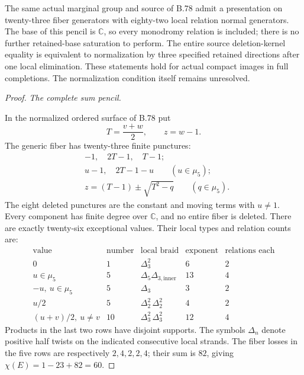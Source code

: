 The same actual marginal group and source of B.78 admit a presentation
on twenty-three fiber generators with eighty-two local relation normal
generators. The base of this pencil is \(\mathbb C\), so every monodromy
relation is included; there is no further retained-base saturation to
perform. The entire source deletion-kernel equality is equivalent to
normalization by three specified retained directions after one local
elimination. These statements hold for actual compact images in full
completions. The normalization condition itself remains unresolved.

\begin{proof}
\emph{The complete sum pencil.}\par
In the normalized ordered surface of B.78 put
\[
              T=\frac{v+w}{2},\qquad z=w-1.
 \tag{B.79.1}
\]
The generic fiber has twenty-three finite punctures:
\[
\begin{split}
 &-1,\quad 2T-1,\quad T-1;\\
 &u-1,\quad 2T-1-u\qquad(u\in\mu _5);\\
 &z=(T-1)\pm\sqrt{T^2-q}\qquad(q\in\mu _5).
\end{split}
 \tag{B.79.2}
\]
The eight deleted punctures are the constant and moving terms with
\(u\ne1\). Every component has finite degree over \(\mathbb C\),
and no entire fiber is deleted. There are exactly twenty-six
exceptional values. Their local types and relation counts are:
\[
\begin{array}{c|c|c|c|c}
\text{value}&\text{number}&\text{local braid}&
\text{exponent}&\text{relations each}\\\hline
0&1&\Delta_3^2&6&2\\
u\in\mu _5&5&\Delta_5\Delta_{3,\mathrm{inner}}&13&4\\
-u,\ u\in\mu _5&5&\Delta_3&3&2\\
u/2&5&\Delta_2^2\,\Delta_2^2&4&2\\
(u+v)/2,\ u\ne v&10&\Delta_3^2\,\Delta_3^2&12&4
\end{array}
 \tag{B.79.3}
\]
Products in the last two rows have disjoint supports. The symbols
\(\Delta_n\) denote positive half twists on the indicated consecutive
local strands. The fiber losses in the five rows are respectively
\(2,4,2,2,4\); their sum is \(82\), giving
\(\chi(E)=1-23+82=60\).


\end{proof}
